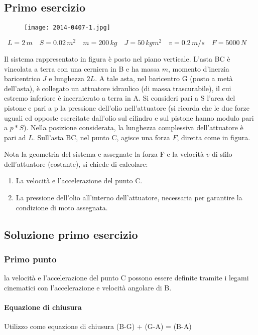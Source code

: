 \documentclass[main.tex]{subfiles}
\begin{document}
\subsection{Primo esercizio}

\begin{figure}[H]
\centering
\texttt{[image: 2014-0407-1.jpg]}
\end{figure}

\[
	L = 2\,m \quad
	S = 0.02\,m^2 \quad
	m = 200\,kg \quad
	J = 50\,kg m^2 \quad
	v = 0.2\,m/s \quad
	F = 5000\,N \quad
\]

Il sistema rappresentato in figura è posto nel piano verticale. L'asta BC è vincolata a terra con una cerniera in B e ha massa $m$, momento d'inerzia baricentrico $J$ e lunghezza $2L$. A tale asta, nel baricentro G (posto a metà dell'asta), è collegato un attuatore idraulico (di massa trascurabile), il cui estremo inferiore è incernierato a terra in A. Si consideri pari a S l'area del pistone e pari a p la pressione dell’olio nell'attuatore (si ricorda che le due forze uguali ed opposte esercitate dall’olio sul cilindro e sul pistone hanno modulo pari a $p*S$).
Nella posizione considerata, la lunghezza complessiva dell'attuatore è pari ad $L$. Sull'asta BC, nel punto C, agisce una forza $F$, diretta come in figura.

Nota la geometria del sistema e assegnate la forza F e la velocità $v$ di sfilo dell'attuatore (costante), si chiede di calcolare:
\begin{enumerate}
\item La velocità e l’accelerazione del punto C.
\item La pressione dell’olio all'interno dell'attuatore, necessaria per garantire la condizione di moto assegnata.
\end{enumerate}

\clearpage

\subsection{Soluzione primo esercizio}

\subsubsection{Primo punto}
la velocità e l'accelerazione del punto C possono essere definite tramite i legami cinematici con l'accelerazione e velocità angolare di B.
\\
\paragraph{Equazione di chiusura} Utilizzo come equazione di chiusura (B-G) + (G-A) = (B-A)
\end{document}
